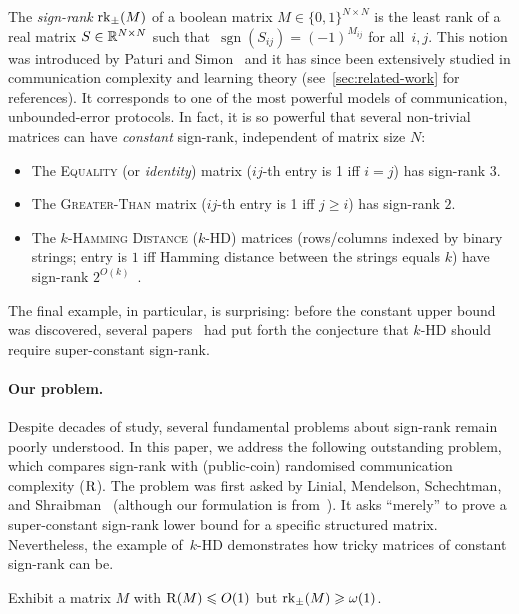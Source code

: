 \documentclass{article}
\begin{document}
The \emph{sign-rank} $\operatorname{rk}_\pm(M)$ of a boolean matrix $M\in\{0,1\}^{N\times N}$ is the least rank of a real matrix $S\in\mathbb{R}^{N\times N}$ such that~$\operatorname{sgn}(S_{ij}) = (-1)^{M_{ij}}$ for all~$i,j$. This notion was introduced by Paturi and Simon~\cite{PS86} and it has since been extensively studied in communication complexity and learning theory (see~\cref{sec:related-work} for references).
It corresponds to one of the most powerful models of communication, unbounded-error protocols. In fact, it is so powerful that several non-trivial matrices can have \emph{constant} sign-rank, independent of matrix size $N$:
\begin{itemize}[label=$-$,itemsep=0em]
    \item The \textsc{Equality} (or \emph{identity}) matrix ($ij$-th entry is 1 iff $i=j$) has sign-rank $3$.
    
    \item The \textsc{Greater-Than} matrix ($ij$-th entry is 1 iff $j\geq i$) has sign-rank $2$.
    
    \item The \textsc{$k$-Hamming Distance} ($k$-HD) matrices (rows/columns  indexed by binary strings; entry is $1$ iff Hamming distance between the strings equals $k$) have sign-rank $2^{O(k)}$~\cite{GHIS25}.
\end{itemize}
The final example, in particular, is surprising: before the constant upper bound was discovered, several papers~\cite{HHPTZ22,HHM23} had put forth the conjecture that $k$-HD should require super-constant sign-rank. 


\paragraph{Our problem.}
Despite decades of study, several fundamental problems about sign-rank remain poorly understood. In this paper, we address the following outstanding problem, which compares sign-rank with (public-coin) randomised communication complexity ($\operatorname{R}$). The problem was first asked by Linial, Mendelson, Schechtman, and Shraibman~\cite{LMSS07} (although our formulation is from~\cite{HHPTZ22}). It asks ``merely'' to prove a super-constant sign-rank lower bound for a specific structured matrix. Nevertheless, the example of~$k$-HD demonstrates how tricky matrices of constant sign-rank can be.

\begin{boxquestion} \label{prob1}
Exhibit a matrix $M$ with $\operatorname{R}(M)\leqslant O(1)$ but $\operatorname{rk}_\pm(M)\geqslant\omega(1)$.
\end{boxquestion}
\end{document}
